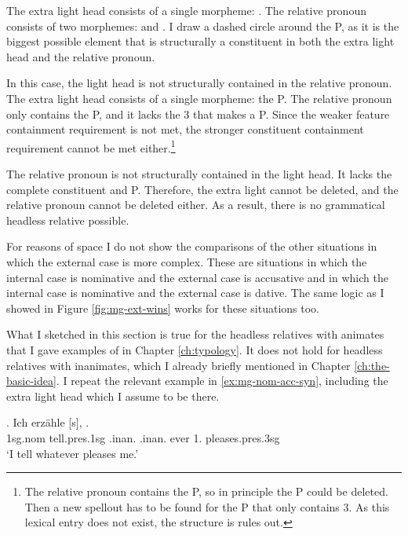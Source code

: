 The extra light head consists of a single morpheme: .
The relative pronoun consists of two morphemes:  and .
I draw a dashed circle around the P, as it is the biggest possible element that is structurally a constituent in both the extra light head and the relative pronoun.

In this case, the light head is not structurally contained in the relative pronoun.
The extra light head consists of a single morpheme: the P.
The relative pronoun only contains the P, and it lacks the 3 that makes a P. Since the weaker feature containment requirement is not met, the stronger constituent containment requirement cannot be met either.\footnote{
The relative pronoun contains the P, so in principle the P could be deleted. Then a new spellout has to be found for the P that only contains 3. As this lexical entry does not exist, the structure is rules out.
}

The relative pronoun is not structurally contained in the light head. It lacks the complete constituent and P.
Therefore, the extra light cannot be deleted, and the relative pronoun cannot be deleted either.
As a result, there is no grammatical headless relative possible.

For reasons of space I do not show the comparisons of the other situations in which the external case is more complex. These are situations in which the internal case is nominative and the external case is accusative and in which the internal case is nominative and the external case is dative. The same logic as I showed in Figure \ref{fig:mg-ext-wins} works for these situations too.

What I sketched in this section is true for the headless relatives with animates that I gave examples of in Chapter \ref{ch:typology}. It does not hold for headless relatives with inanimates, which I already briefly mentioned in Chapter \ref{ch:the-basic-idea}. I repeat the relevant example in \ref{ex:mg-nom-acc-syn}, including the extra light head which I assume to be there.

\exg. Ich erzähle [s],    .\\
 1\ac{sg}.\ac{nom} tell.\ac{pres}.1\ac{sg}\scsub{[acc]} .\ac{inan}. .\ac{inan}. ever 1. pleases.\ac{pres}.3\ac{sg}\scsub{[nom]}\\
 `I tell whatever pleases me.' \label{ex:mg-nom-acc-syn}

